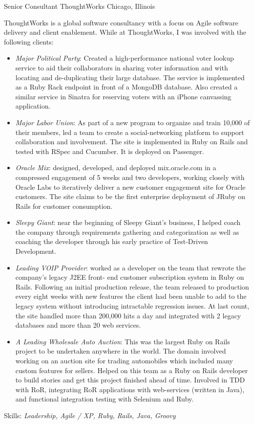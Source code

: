 \documentclass[11pt,letterpaper]{moderncv}
\begin{document}
 {Senior Consultant} {ThoughtWorks} {Chicago, Illinois} {} {%
  ThoughtWorks is a global software consultancy with a focus on Agile software
  delivery and client enablement. While at ThoughtWorks, I was involved with
  the following clients:
  \begin{itemize}
  \item \emph{Major Political Party}: Created a high-performance national
    voter lookup service to aid their collaborators in sharing voter
    information and with locating and de-duplicating their large
    database. The service is implemented as a Ruby Rack endpoint in
    front of a MongoDB database. Also created a similar service in
    Sinatra for reserving voters with an iPhone canvassing application.
  \item \emph{Major Labor Union}: As part of a new program to organize
    and train 10,000 of their members, led a team to create a
    social-networking platform to support collaboration and involvement.
    The site is implemented in Ruby on Rails and tested with RSpec and
    Cucumber. It is deployed on Passenger.
  \item \emph{Oracle Mix}: designed, developed, and deployed
    mix.oracle.com in a compressed engagement of 5 weeks and two
    developers, working closely with Oracle Labs to iteratively deliver
    a new customer engagement site for Oracle customers. The site claims
    to be the first enterprise deployment of JRuby on Rails for customer
    consumption.
  \item \emph{Sleepy Giant}: near the beginning of Sleepy Giant's
    business, I helped coach the company through requirements gathering
    and categorization as well as coaching the developer through his
    early practice of Test-Driven Development.
  \item \emph{Leading VOIP Provider}: worked as a developer on the team
    that rewrote the company's legacy J2EE front- end customer
    subscription system in Ruby on Rails. Following an initial
    production release, the team released to production every eight
    weeks with new features the client had been unable to add to the
    legacy system without introducing intractable regression issues. At
    last count, the site handled more than 200,000 hits a day and
    integrated with 2 legacy databases and more than 20 web services.
  \item \emph{A Leading Wholesale Auto Auction}: This was the largest
    Ruby on Rails project to be undertaken anywhere in the world. The
    domain involved working on an auction site for trading automobiles
    which included many custom features for sellers. Helped on this team
    as a Ruby on Rails developer to build stories and get this project
    finished ahead of time. Involved in TDD with RoR, integrating RoR
    applications with web-services (written in Java), and functional
    integration testing with Selenium and Ruby.
  \end{itemize}
  Skills: \emph{Leadership, Agile / XP, Ruby, Rails, Java, Groovy}
}
\end{document}
